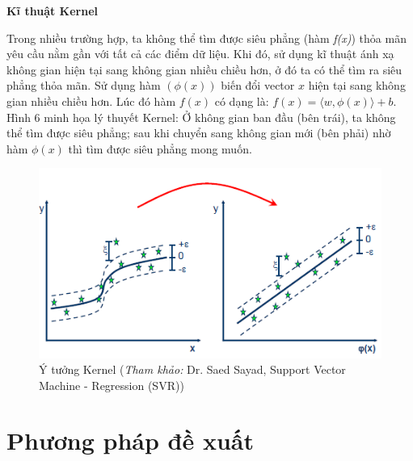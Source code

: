 \documentclass[12pt]{extarticle}
\begin{document}
			\par \textbf{Kĩ thuật Kernel}
			\par Trong nhiều trường hợp, ta không thể tìm được siêu phẳng (hàm \textit{f(x)}) thỏa mãn yêu cầu nằm gần với tất cả các điểm dữ liệu. Khi đó, sử dụng kĩ thuật ánh xạ không gian hiện tại sang không gian nhiều chiều hơn, ở đó ta có thể tìm ra siêu phẳng thỏa mãn. Sử dụng hàm $(\phi(x))$ biến đổi vector $x$ hiện tại sang không gian nhiều chiều hơn. Lúc đó hàm $f(x)$ có dạng là: $f(x)=\langle w,\phi(x)\rangle + b$. Hình 6 minh họa lý thuyết Kernel: Ở không gian ban đầu (bên trái), ta không thể tìm được siêu phẳng; sau khi chuyển sang không gian mới (bên phải) nhờ hàm $\phi(x)$ thì tìm được siêu phẳng mong muốn.
				\begin{figure}[h!]
				\includegraphics[width=\linewidth]{kernel}
				\caption[Ý tưởng Kernel]{Ý tưởng Kernel (\textit{Tham khảo:} Dr. Saed Sayad, Support Vector Machine - Regression (SVR))}
				\label{fig:svr}
			\end{figure}
	\section{Phương pháp đề xuất}								
\end{document}
